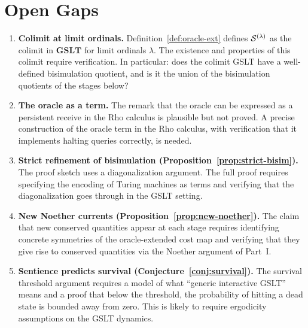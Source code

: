 \chapter{Open Gaps}
\label{sec:gaps}

\begin{enumerate}[label=\textbf{Gap \arabic*.}, leftmargin=*, itemsep=8pt]

  \item \textbf{Colimit at limit ordinals.}
        Definition~\ref{def:oracle-ext} defines $\mathcal{S}^{(\lambda)}$
        as the colimit in $\mathbf{GSLT}$ for limit ordinals
        $\lambda$.
        The existence and properties of this colimit require
        verification.
        In particular: does the colimit GSLT have a well-defined
        bisimulation quotient, and is it the union of the bisimulation
        quotients of the stages below?

  \item \textbf{The oracle as a term.}
        The remark that the oracle can be expressed as a persistent
        receive in the Rho calculus is plausible but not proved.
        A precise construction of the oracle term in the
        Rho calculus, with verification that it implements
        halting queries correctly, is needed.

  \item \textbf{Strict refinement of bisimulation
        (Proposition~\ref{prop:strict-bisim}).}
        The proof sketch uses a diagonalization argument.
        The full proof requires specifying the encoding of Turing
        machines as terms and verifying that the diagonalization
        goes through in the GSLT setting.

  \item \textbf{New Noether currents (Proposition~\ref{prop:new-noether}).}
        The claim that new conserved quantities appear at each
        stage requires identifying concrete symmetries of the
        oracle-extended cost map and verifying that they give
        rise to conserved quantities via the Noether argument of
        Part~I.

  \item \textbf{Sentience predicts survival
        (Conjecture~\ref{conj:survival}).}
        The survival threshold argument requires a model of what
        ``generic interactive GSLT'' means and a proof that below
        the threshold, the probability of hitting a dead state
        is bounded away from zero.
        This is likely to require ergodicity assumptions on the
        GSLT dynamics.


\end{enumerate}
